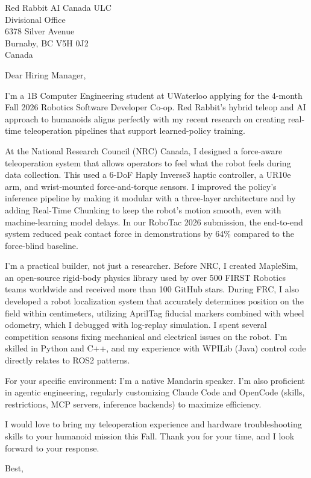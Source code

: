 \documentclass[
	parskip=half, %
	enlargefirstpage=true, %
]{scrlttr2} %
\begin{document}

\begin{letter}{
	Red Rabbit AI Canada ULC \\
	Divisional Office \\
	6378 Silver Avenue \\
	Burnaby, BC V5H 0J2 \\
	Canada
}

\opening{Dear Hiring Manager,}

I'm a 1B Computer Engineering student at UWaterloo applying for the 4-month Fall 2026 Robotics Software Developer Co-op. Red Rabbit's hybrid teleop and AI approach to humanoids aligns perfectly with my recent research on creating real-time teleoperation pipelines that support learned-policy training.

At the National Research Council (NRC) Canada, I designed a force-aware teleoperation system that allows operators to feel what the robot feels during data collection. This used a 6-DoF Haply Inverse3 haptic controller, a UR10e arm, and wrist-mounted force-and-torque sensors. I improved the policy's inference pipeline by making it modular with a three-layer architecture and by adding Real-Time Chunking to keep the robot's motion smooth, even with machine-learning model delays. In our RoboTac 2026 submission, the end-to-end system reduced peak contact force in demonstrations by 64\% compared to the force-blind baseline.

I'm a practical builder, not just a researcher. Before NRC, I created MapleSim, an open-source rigid-body physics library used by over 500 FIRST Robotics teams worldwide and received more than 100 GitHub stars. During FRC, I also developed a robot localization system that accurately determines position on the field within centimeters, utilizing AprilTag fiducial markers combined with wheel odometry, which I debugged with log-replay simulation. I spent several competition seasons fixing mechanical and electrical issues on the robot. I'm skilled in Python and C++, and my experience with WPILib (Java) control code directly relates to ROS2 patterns.

For your specific environment: I'm a native Mandarin speaker. I'm also proficient in agentic engineering, regularly customizing Claude Code and OpenCode (skills, restrictions, MCP servers, inference backends) to maximize efficiency.

I would love to bring my teleoperation experience and hardware troubleshooting skills to your humanoid mission this Fall. Thank you for your time, and I look forward to your response.

Best, \\


\end{letter}
\end{document}
